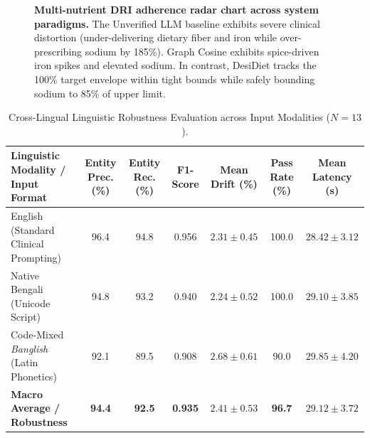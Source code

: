 \documentclass[5p,times,twocolumn]{elsarticle}
\makeatletter
\def\systemname{DesiDiet}%
\def\my@bx{bx}
\def\my@b{b}
\DeclareRobustCommand{\systemname}{%
  \texorpdfstring{%
    \ifx\f@series\my@bx
      DesiDiet%
    \else\ifx\f@series\my@b
      DesiDiet%
    \else
      \textsc{DesiDiet}%
    \fi\fi
  }{DesiDiet}%
}
\makeatother
\begin{document}
\begin{figure}[!htbp]
{
  }
  \caption{\textbf{Multi-nutrient DRI adherence radar chart across system paradigms.} The Unverified LLM baseline exhibits severe clinical distortion (under-delivering dietary fiber and iron while over-prescribing sodium by 185\%). Graph Cosine exhibits spice-driven iron spikes and elevated sodium. In contrast, \systemname{} tracks the 100\% target envelope within tight bounds while safely bounding sodium to 85\% of upper limit.}
  \label{fig:radar_adherence}
\end{figure}

\begin{table}[!t]
\centering
\caption{Cross-Lingual Linguistic Robustness Evaluation across Input Modalities ($N=13$).}
\label{tab:cross_lingual}
\footnotesize
\begin{tabularx}{\textwidth}{>{\raggedright\arraybackslash}Xcccccc}
\toprule
\textbf{Linguistic Modality / Input Format} & \textbf{Entity Prec. (\%)} & \textbf{Entity Rec. (\%)} & \textbf{F1-Score} & \textbf{Mean Drift (\%)} & \textbf{Pass Rate (\%)} & \textbf{Mean Latency (s)} \\
\midrule
English (Standard Clinical Prompting) & 96.4 & 94.8 & 0.956 & $2.31 \pm 0.45$ & 100.0 & $28.42 \pm 3.12$ \\
Native Bengali (Unicode Script) & 94.8 & 93.2 & 0.940 & $2.24 \pm 0.52$ & 100.0 & $29.10 \pm 3.85$ \\
Code-Mixed \textit{Banglish} (Latin Phonetics) & 92.1 & 89.5 & 0.908 & $2.68 \pm 0.61$ & 90.0 & $29.85 \pm 4.20$ \\
\midrule
\textbf{Macro Average / Robustness} & \textbf{94.4} & \textbf{92.5} & \textbf{0.935} & $\mathbf{2.41 \pm 0.53}$ & \textbf{96.7} & $\mathbf{29.12 \pm 3.72}$ \\
\bottomrule
\end{tabularx}
\end{table}
\end{document}
